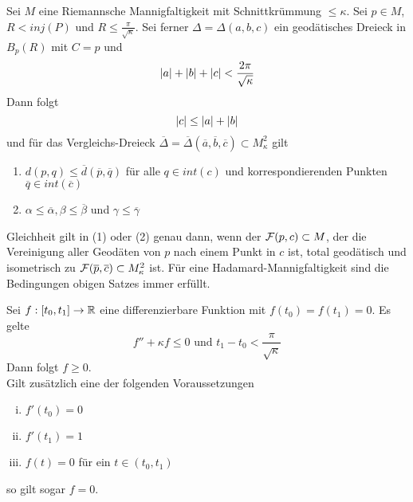 \documentclass{book}
\renewcommand{\l}[1]{\overline{#1}}
\begin{document}
\label{091216}
Sei $M$ eine Riemannsche Mannigfaltigkeit mit Schnittkrümmung $\leq \kappa$. Sei $p \in M$, $R < inj(P)$ und $R \leq \frac{\pi}{\sqrt{\kappa}}$. Sei ferner $\Delta = \Delta(a,b,c)$ ein geodätisches Dreieck in $B_p(R)$ mit $C = p$ und
\[ \left|a\right| + \left|b\right| + \left|c\right| < \frac{2\pi}{\sqrt{\kappa}} \]
Dann folgt
\[\left|c\right| \leq \left|a\right| + \left|b\right|\]
und für das Vergleichs-Dreieck $\l \Delta = \l \Delta(\l a, \l b, \l c) \subset M^2_\kappa$ gilt
\begin{enumerate}[(1)]
\item $d(p,q) \leq \l d(\l p, \l q)$ für alle $q \in int(c)$ und korrespondierenden Punkten $\l q \in int (\l c)$
\item $\alpha \leq \l \alpha, \beta \leq \l \beta$ und $\gamma \leq \l \gamma$
\end{enumerate}
Gleichheit gilt in (1) oder (2) genau dann, wenn der  $\mathcal{F}(p,c)\subset M$, der die Vereinigung aller Geodäten von $p$ nach einem Punkt in $c$ ist, total geodätisch und isometrisch zu $\F(\l p, \l c) \subset M^2_\kappa$ ist.
\Bem{}
Für eine Hadamard-Mannigfaltigkeit sind die Bedingungen obigen Satzes immer erfüllt.

\Lem{}
Sei $f: [t_0,t_1] \overset{}{\rightarrow} \mathbb{R}$ eine differenzierbare Funktion mit $f(t_0) = f(t_1) = 0$. Es gelte
\[ f'' + \kappa f \leq 0 \text{ und } t_1 - t_0 < \frac{\pi}{\sqrt{\kappa}} \]
Dann folgt $f \geq 0$.\\
Gilt zusätzlich eine der folgenden Voraussetzungen
\begin{enumerate}[i.]
\item $f'(t_0) = 0$
\item $f'(t_1) = 1$
\item $f(t) = 0$ für ein $t \in (t_0,t_1)$
\end{enumerate}
so gilt sogar $f = 0$.
\end{document}
